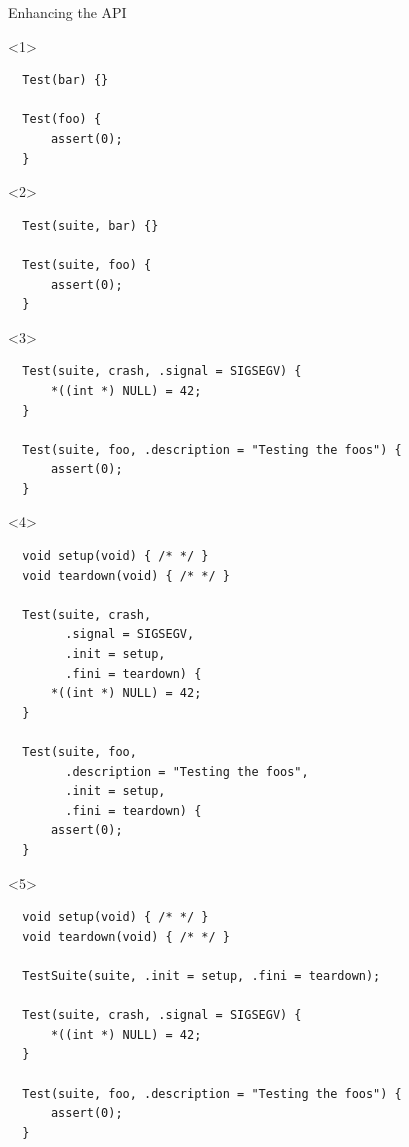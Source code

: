 \documentclass[10pt]{beamer}
\begin{document}
\begin{frame}[fragile]{Enhancing the API}

  \begin{onlyenv}<1>
  \begin{lstlisting}
  Test(bar) {}

  Test(foo) {
      assert(0);
  }
  \end{lstlisting}
  \end{onlyenv}

  \begin{onlyenv}<2>
  \begin{lstlisting}
  Test(suite, bar) {}

  Test(suite, foo) {
      assert(0);
  }
  \end{lstlisting}
  \end{onlyenv}

  \begin{onlyenv}<3>
  \begin{lstlisting}
  Test(suite, crash, .signal = SIGSEGV) {
      *((int *) NULL) = 42;
  }

  Test(suite, foo, .description = "Testing the foos") {
      assert(0);
  }
  \end{lstlisting}
  \end{onlyenv}

  \begin{onlyenv}<4>
  \begin{lstlisting}
  void setup(void) { /* */ }
  void teardown(void) { /* */ }

  Test(suite, crash,
        .signal = SIGSEGV,
        .init = setup,
        .fini = teardown) {
      *((int *) NULL) = 42;
  }

  Test(suite, foo,
        .description = "Testing the foos",
        .init = setup,
        .fini = teardown) {
      assert(0);
  }
  \end{lstlisting}
  \end{onlyenv}

  \begin{onlyenv}<5>
  \begin{lstlisting}
  void setup(void) { /* */ }
  void teardown(void) { /* */ }

  TestSuite(suite, .init = setup, .fini = teardown);

  Test(suite, crash, .signal = SIGSEGV) {
      *((int *) NULL) = 42;
  }

  Test(suite, foo, .description = "Testing the foos") {
      assert(0);
  }
  \end{lstlisting}
  \end{onlyenv}


\end{frame}
\end{document}

